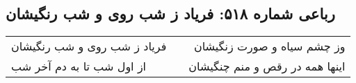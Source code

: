 \begin{center}
\section*{رباعی شماره ۵۱۸: فریاد ز شب روی و شب رنگیشان}
\label{sec:sh518}
\begin{longtable}{l p{0.5cm} r}
فریاد ز شب روی و شب رنگیشان
&&
وز چشم سیاه و صورت زنگیشان
\\
از اول شب تا به دم آخر شب
&&
اینها همه در رقص و منم چنگیشان
\\
\end{longtable}
\end{center}
